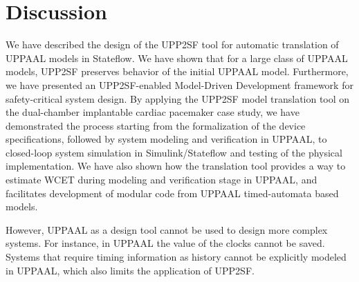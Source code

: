 \section{Discussion}

We have described the design of the UPP2SF tool for automatic translation of UPPAAL models in Stateflow. 
We have shown that for a large class of UPPAAL models, UPP2SF preserves behavior of the initial UPPAAL model. 
Furthermore, we have presented an UPP2SF-enabled Model-Driven Development framework for safety-critical system design. 
By applying the UPP2SF model translation tool on the dual-chamber implantable cardiac pacemaker case study, we have demonstrated the process starting from the formalization of the device specifications, followed by system modeling and verification in UPPAAL, to closed-loop system simulation in Simulink/Stateflow and testing of the physical implementation. 
We have also shown how the translation tool provides a way to estimate WCET during modeling and verification stage in UPPAAL, and facilitates development of modular code from UPPAAL timed-automata based models. 

However, UPPAAL as a design tool cannot be used to design more complex systems.
For instance, in UPPAAL the value of the clocks cannot be saved.
Systems that require timing information as history cannot be explicitly modeled in UPPAAL, which also limits the application of UPP2SF.














